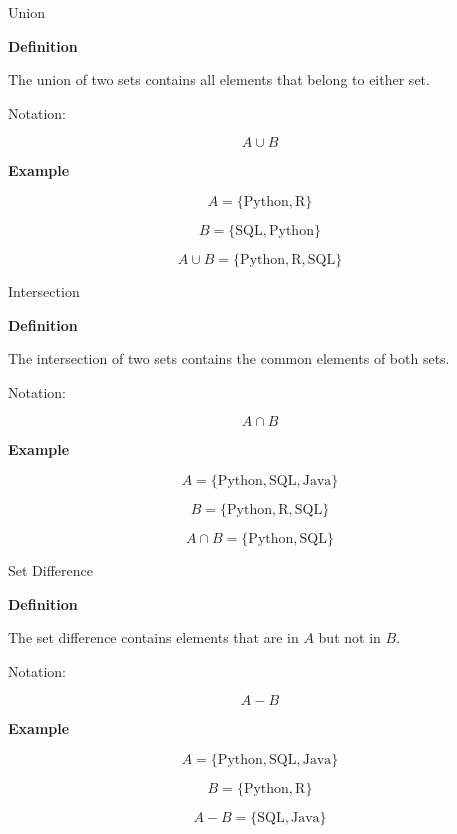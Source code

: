 \documentclass{beamer}
\begin{document}
\begin{frame}{Union}

\small

\textbf{Definition}

The union of two sets contains all elements that belong to either set.

Notation:

\[
A\cup B
\]

\textbf{Example}

\[
A=\{\text{Python},\text{R}\}
\]

\[
B=\{\text{SQL},\text{Python}\}
\]

\[
A\cup B=
\{\text{Python},\text{R},\text{SQL}\}
\]

\end{frame}
\begin{frame}{Intersection}

\small

\textbf{Definition}

The intersection of two sets contains the common elements of both sets.

Notation:

\[
A\cap B
\]

\textbf{Example}

\[
A=\{\text{Python},\text{SQL},\text{Java}\}
\]

\[
B=\{\text{Python},\text{R},\text{SQL}\}
\]

\[
A\cap B=
\{\text{Python},\text{SQL}\}
\]

\end{frame}

\begin{frame}{Set Difference}

\small

\textbf{Definition}

The set difference contains elements that are in $A$ but not in $B$.

Notation:

\[
A-B
\]

\textbf{Example}

\[
A=\{\text{Python},\text{SQL},\text{Java}\}
\]

\[
B=\{\text{Python},\text{R}\}
\]

\[
A-B=
\{\text{SQL},\text{Java}\}
\]

\end{frame}
\end{document}
